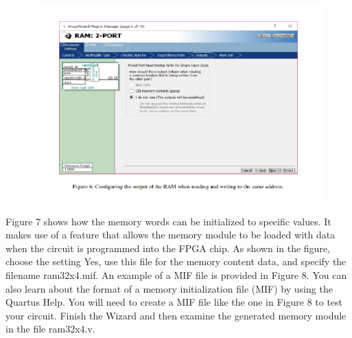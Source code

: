 \begin{figure}[h]
    \centering
    \includegraphics[scale = 0.4]{source/picture/Lab8/bai8_minhhoa2.png}
\end{figure}
Figure 7 shows how the memory words can be initialized to specific values. It makes use of a feature that
allows the memory module to be loaded with data when the circuit is programmed into the FPGA chip.
As shown in the figure, choose the setting Yes, use this file for the memory content data, and specify
the filename ram32x4.mif. An example of a MIF file is provided in Figure 8. You can also learn about the
format of a memory initialization file (MIF) by using the Quartus Help. You will need to create a MIF file
like the one in Figure 8 to test your circuit. Finish the Wizard and then examine the generated memory
module in the file ram32x4.v.

